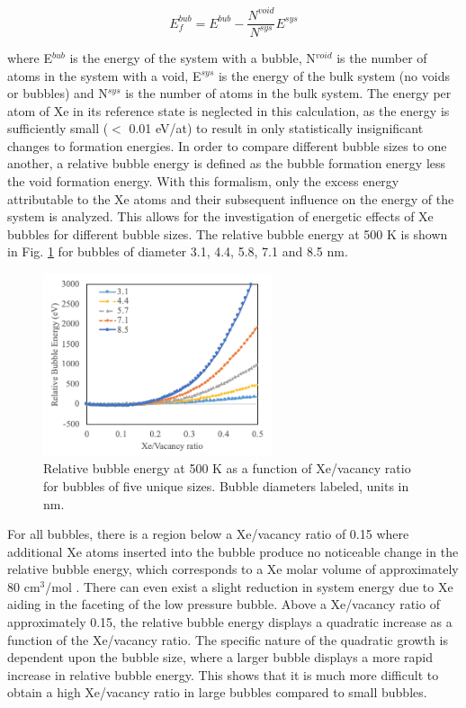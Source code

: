 \documentclass[review]{elsarticle}
\begin{document}
\begin{equation}
\label{eq:bubE}
E_f^{bub}= E^{bub}-\frac{N^{void}}{N^{sys}}E^{sys}
\end{equation}

where E$^{bub}$ is the energy of the system with a bubble, N$^{void}$ is the number of atoms in the system with a void, E$^{sys}$ is the energy of the bulk system (no voids or bubbles) and N$^{sys}$ is the number of atoms in the bulk system. The energy per atom of Xe in its reference state is neglected in this calculation, as the energy is sufficiently small ($<$ 0.01 eV/at) to result in only statistically insignificant changes to formation energies. In order to compare different bubble sizes to one another, a relative bubble energy is defined as the bubble formation energy less the void formation energy. With this formalism, only the excess energy attributable to the Xe atoms and their subsequent influence on the energy of the system is analyzed. This allows for the investigation of energetic effects of Xe bubbles for different bubble sizes. The relative bubble energy at 500 K is shown in Fig. \ref{fig:bubE} for bubbles of diameter 3.1, 4.4, 5.8, 7.1 and 8.5 nm. 

\begin{figure}[h]
 \centering
 \includegraphics[width=0.6\textwidth]{3_bubE.png} 
 \caption{Relative bubble energy at 500 K as a function of Xe/vacancy ratio for bubbles of five unique sizes. Bubble diameters labeled, units in nm.}
 \label{fig:bubE}
\end{figure}

For all bubbles, there is a region below a Xe/vacancy ratio of 0.15 where additional Xe atoms inserted into the bubble produce no noticeable change in the relative bubble energy, which corresponds to a Xe molar volume of approximately 80 cm$^3$/mol . There can even exist a slight reduction in system energy due to Xe aiding in the faceting of the low pressure bubble. Above a Xe/vacancy ratio of approximately 0.15, the relative bubble energy displays a quadratic increase as a function of the Xe/vacancy ratio. The specific nature of the quadratic growth is dependent upon the bubble size, where a larger bubble displays a more rapid increase in relative bubble energy. This shows that it is much more difficult to obtain a high Xe/vacancy ratio in large bubbles compared to small bubbles. 
\end{document}

